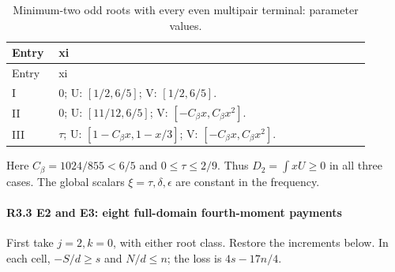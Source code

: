 \begingroup\small
\setlength{\tabcolsep}{3pt}
\setlength{\LTleft}{0pt}\setlength{\LTright}{\fill}
\begin{longtable}{@{}p{0.1200\linewidth}p{0.8000\linewidth}@{}}
\caption{Minimum-two odd roots with every even multipair terminal: parameter values.}\label{tab:parameters:r2-c003:4}\\
\toprule
Entry & xi \\
\midrule\endfirsthead
\toprule
Entry & xi \\
\midrule\endhead
\bottomrule\endfoot
I & 0; U: \([1/2,\allowbreak 6/5]\); V: \([1/2,\allowbreak 6/5]\). \\
\addlinespace[2pt]
II & 0; U: \([11/12,\allowbreak 6/5]\); V: \([-C_\beta x,\allowbreak C_\beta x^2]\). \\
\addlinespace[2pt]
III & \(\tau\); U: \([1-C_\beta x,\allowbreak 1-x/3]\); V: \([-C_\beta x,\allowbreak C_\beta x^2]\). \\
\end{longtable}
\endgroup


Here \(C_\beta=1024/855<6/5\) and \(0\le\tau\le2/9\). Thus \(D_2=\int xU\ge0\) in all three cases. The global scalars \(\xi=\tau,\allowbreak \allowbreak  \delta,\allowbreak \allowbreak  \epsilon\) are constant in the frequency.

\paragraph{R3.3 E2 and E3: eight full-domain fourth-moment payments}

First take \(j=2,\allowbreak \allowbreak  k=0\), with either root class. Restore the increments below. In each cell, \(-S/d\ge s\) and \(N/d\le n\); the loss is \(4s-17n/4\).


